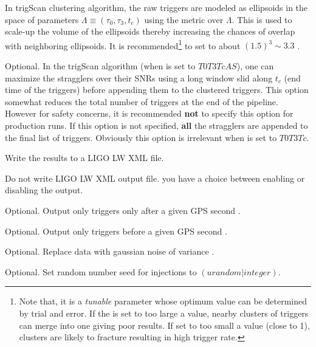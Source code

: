 \begin{entry}
\begin{entry}
\item[\option{--ts-volume-safety}~\parm{SAFETYFAC}] In trigScan clustering algorithm, the raw triggers are modeled as ellipsoids in the space of parameters $\Lambda \equiv (\tau_0, \tau_3, t_c)$ using the metric over $\Lambda$. This  is used to scale-up the volume of the ellipsoids thereby increasing the chances of overlap with neighboring ellipsoids. It is recommended\footnote{Note that, it is a {\it{tunable}} parameter whose optimum value can be determined by trial and error. If the  is set to too large a value, nearby clusters of triggers can merge into one giving poor results. If set to too small a value (close to 1), clusters are likely to fracture resulting in high trigger rate.} to set  to about $(1.5)^3 \sim 3.3$ .  

\item[\option{--ts-endtime-interval}~\parm{MSEC}] Optional. In the trigScan algorithm (when  is set to $T0T3TcAS$), one can maximize the stragglers over their SNRs using a  long window slid along $t_c$ (end time of the triggers) before appending them to the clustered triggers. This option somewhat reduces the total number of triggers at the end of the pipeline. However for safety concerns, it is recommended {\bf{not}} to specify this option for production runs. If this option is not specified, {\bf{all}} the stragglers are appended to the final list of triggers. Obviously this option is irrelevant when  is set to $T0T3Tc$.

\item[\option{--enable-output}] Write the results to a LIGO LW XML file.

\item[\option{--disable-output}] Do not write LIGO LW XML output file. you 
have a choice between enabling or disabling the output.

\item[\option{--trig-start-time}~\parm{SEC}] Optional. Output only triggers 
only after a given GPS second .

\item[\option{--trig-end-time}~\parm{SEC}] Optional. Output only triggers 
before a given GPS second .

\item[\option{--gaussian-noise}~\parm{VAR}] Optional. Replace data with 
gaussian noise of variance .

\item[\option{--random-seed}~\parm{SEED}] Optional. Set random number seed 
for injections to  $(urandom|integer)$.


\end{entry}
\end{entry}
